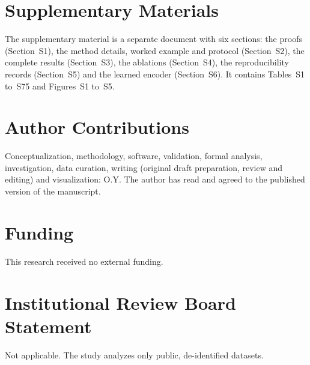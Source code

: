 \documentclass[12pt]{article}
\begin{document}










\section*{Supplementary Materials}
The supplementary material is a separate document with six sections: the proofs (Section~S1), the method details, worked example and protocol (Section~S2), the complete results (Section~S3), the ablations (Section~S4), the reproducibility records (Section~S5) and the learned encoder (Section~S6). It contains Tables~S1 to~S75 and Figures~S1 to~S5.

\section*{Author Contributions}
Conceptualization, methodology, software, validation, formal analysis, investigation, data curation, writing (original draft preparation, review and editing) and visualization: O.Y. The author has read and agreed to the published version of the manuscript.

\section*{Funding}
This research received no external funding.

\section*{Institutional Review Board Statement}
Not applicable. The study analyzes only public, de-identified datasets.
\end{document}
